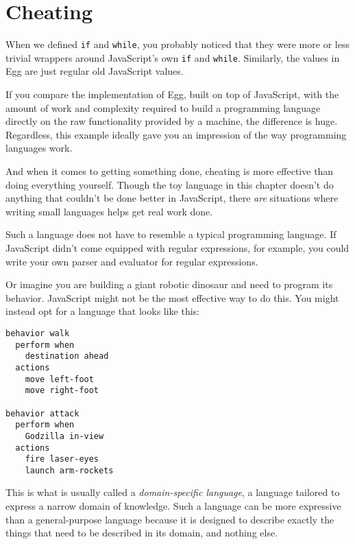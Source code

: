 \section{Cheating}

When we defined \lstinline`if` and \lstinline`while`, you probably noticed that they were more or less trivial wrappers around JavaScript's own \lstinline`if` and \lstinline`while`. Similarly, the values in Egg are just regular old JavaScript values.

If you compare the implementation of Egg, built on top of JavaScript, with the amount of work and complexity required to build a programming language directly on the raw functionality provided by a machine, the difference is huge. Regardless, this example ideally gave you an impression of the way programming languages work.

And when it comes to getting something done, cheating is more effective than doing everything yourself. Though the toy language in this chapter doesn't do anything that couldn't be done better in JavaScript, there \emph{are} situations where writing small languages helps get real work done.

Such a language does not have to resemble a typical programming language. If JavaScript didn't come equipped with regular expressions, for example, you could write your own parser and evaluator for regular expressions.

Or imagine you are building a giant robotic dinosaur and need to program its behavior. JavaScript might not be the most effective way to do this. You might instead opt for a language that looks like this:

\begin{lstlisting}
behavior walk
  perform when
    destination ahead
  actions
    move left-foot
    move right-foot

behavior attack
  perform when
    Godzilla in-view
  actions
    fire laser-eyes
    launch arm-rockets
\end{lstlisting}
\noindent{}

This is what is usually called a \emph{domain-specific language}, a language tailored to express a narrow domain of knowledge. Such a language can be more expressive than a general-purpose language because it is designed to describe exactly the things that need to be described in its domain, and nothing else.

